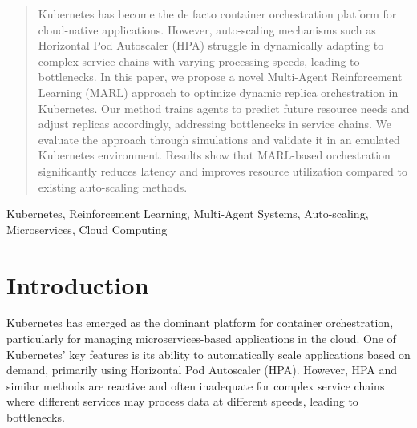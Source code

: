 \documentclass[conference]{IEEEtran}
\begin{document}


\maketitle

\begin{abstract}
    Kubernetes has become the de facto container orchestration platform for cloud-native applications. However, auto-scaling mechanisms such as Horizontal Pod Autoscaler (HPA) struggle in dynamically adapting to complex service chains with varying processing speeds, leading to bottlenecks. In this paper, we propose a novel Multi-Agent Reinforcement Learning (MARL) approach to optimize dynamic replica orchestration in Kubernetes. Our method trains agents to predict future resource needs and adjust replicas accordingly, addressing bottlenecks in service chains. We evaluate the approach through simulations and validate it in an emulated Kubernetes environment. Results show that MARL-based orchestration significantly reduces latency and improves resource utilization compared to existing auto-scaling methods.
\end{abstract}

\begin{IEEEkeywords}
    Kubernetes, Reinforcement Learning, Multi-Agent Systems, Auto-scaling, Microservices, Cloud Computing
\end{IEEEkeywords}

\section{Introduction}
Kubernetes has emerged as the dominant platform for container orchestration, particularly for managing microservices-based applications in the cloud. One of Kubernetes' key features is its ability to automatically scale applications based on demand, primarily using Horizontal Pod Autoscaler (HPA). However, HPA and similar methods are reactive and often inadequate for complex service chains where different services may process data at different speeds, leading to bottlenecks.
\end{document}
